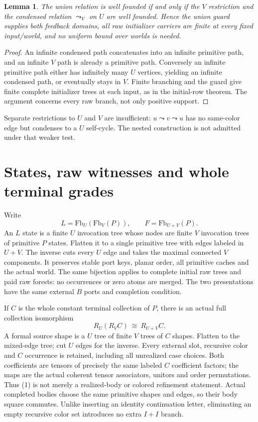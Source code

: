 \documentclass[11pt]{article}\usepackage{amsmath,amssymb,amsthm,geometry}\geometry{margin=1in}\newtheorem{lemma}{Lemma}\newtheorem{theorem}[lemma]{Theorem}
\begin{document}
\begin{lemma}
The union relation is well founded if and only if the $V$ restriction and the condensed relation $\leadsto_V$ on $U$ are well founded. Hence the union guard supplies both feedback domains, all raw initializer carriers are finite at every fixed input/world, and no uniform bound over worlds is needed.
\end{lemma}
\begin{proof}
An infinite condensed path concatenates into an infinite primitive path, and an infinite $V$ path is already a primitive path. Conversely an infinite primitive path either has infinitely many $U$ vertices, yielding an infinite condensed path, or eventually stays in $V$. Finite branching and the guard give finite complete initializer trees at each input, as in the initial-row theorem. The argument concerns every raw branch, not only positive support.
\end{proof}
Separate restrictions to $U$ and $V$ are insufficient: $u\leadsto v\leadsto u$ has no same-color edge but condenses to a $U$ self-cycle. The nested construction is not admitted under that weaker test.

\section{States, raw witnesses and whole terminal grades}
Write
\[
                 L=\mathrm{Fb}_U(\mathrm{Fb}_V(P)),\qquad
                 F=\mathrm{Fb}_{U+V}(P).
\]
An $L$ state is a finite $U$ invocation tree whose nodes are finite $V$ invocation trees of primitive $P$ states. Flatten it to a single primitive tree with edges labeled in $U+V$. The inverse cuts every $U$ edge and takes the maximal connected $V$ components. It preserves stable port keys, planar order, all primitive caches and the actual world. The same bijection applies to complete initial raw trees and paid raw forests: no occurrences or zero atoms are merged. The two presentations have the same external $B$ ports and completion condition.

If $C$ is the whole constant terminal collection of $P$, there is an actual full collection isomorphism
\[
                    R_U(R_VC)\ \cong\ R_{U+V}C.       \tag{1}
\]
A formal source shape is a $U$ tree of finite $V$ trees of $C$ shapes. Flatten to the mixed-edge tree; cut $U$ edges for the inverse. Every external slot, recursive color and $C$ occurrence is retained, including all unrealized case choices. Both coefficients are tensors of precisely the same labeled $C$ coefficient factors; the maps are the actual coherent tensor associators, unitors and order permutations. Thus (1) is not merely a realized-body or colored refinement statement. Actual completed bodies choose the same primitive shapes and edges, so their body square commutes. Unlike inserting an identity continuation letter, eliminating an empty recursive color set introduces no extra $I+I$ branch.
\end{document}
